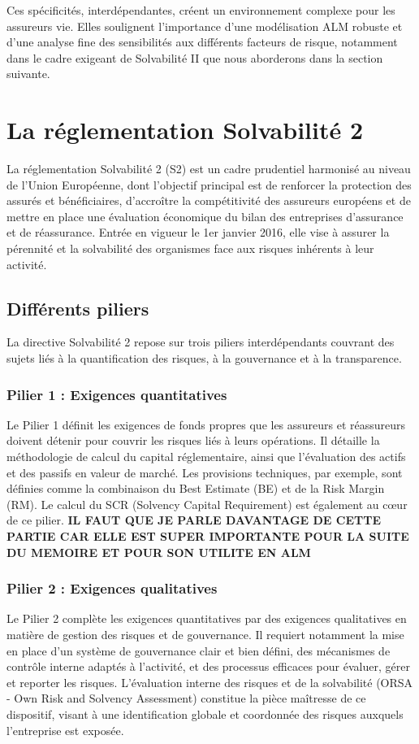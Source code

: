 \bigskip %

Ces spécificités, interdépendantes, créent un environnement complexe pour les assureurs vie. Elles soulignent l'importance d'une modélisation ALM robuste et d'une analyse fine des sensibilités aux différents facteurs de risque, notamment dans le cadre exigeant de Solvabilité II que nous aborderons dans la section suivante.


\section{La réglementation Solvabilité 2}

La réglementation Solvabilité 2 (S2) est un cadre prudentiel harmonisé au niveau de l'Union Européenne, dont l'objectif principal est de renforcer la protection des assurés et bénéficiaires, d'accroître la compétitivité des assureurs européens et de mettre en place une évaluation économique du bilan des entreprises d'assurance et de réassurance. Entrée en vigueur le 1er janvier 2016, elle vise à assurer la pérennité et la solvabilité des organismes face aux risques inhérents à leur activité.

\subsection{Différents piliers}
La directive Solvabilité 2 repose sur trois piliers interdépendants couvrant des sujets liés à la quantification des risques, à la gouvernance et à la transparence.

\subsubsection{Pilier 1 : Exigences quantitatives}
Le Pilier 1 définit les exigences de fonds propres que les assureurs et réassureurs doivent détenir pour couvrir les risques liés à leurs opérations. Il détaille la méthodologie de calcul du capital réglementaire, ainsi que l'évaluation des actifs et des passifs en valeur de marché. Les provisions techniques, par exemple, sont définies comme la combinaison du Best Estimate (BE) et de la Risk Margin (RM). Le calcul du SCR (Solvency Capital Requirement) est également au cœur de ce pilier.
\textbf{IL FAUT QUE JE PARLE DAVANTAGE DE CETTE PARTIE CAR ELLE EST SUPER IMPORTANTE POUR LA SUITE DU MEMOIRE ET POUR SON UTILITE EN ALM}
\subsubsection{Pilier 2 : Exigences qualitatives}
Le Pilier 2 complète les exigences quantitatives par des exigences qualitatives en matière de gestion des risques et de gouvernance. Il requiert notamment la mise en place d'un système de gouvernance clair et bien défini, des mécanismes de contrôle interne adaptés à l'activité, et des processus efficaces pour évaluer, gérer et reporter les risques. L'évaluation interne des risques et de la solvabilité (ORSA - Own Risk and Solvency Assessment) constitue la pièce maîtresse de ce dispositif, visant à une identification globale et coordonnée des risques auxquels l'entreprise est exposée.

